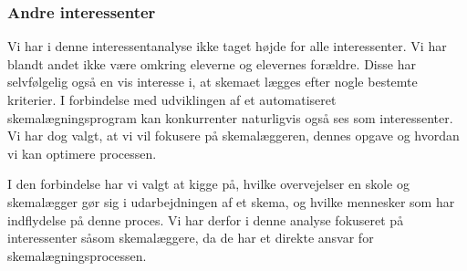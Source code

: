 \subsubsection{Andre interessenter}
Vi har i denne interessentanalyse ikke taget højde for alle interessenter. Vi har blandt andet ikke være omkring eleverne og elevernes forældre. Disse har selvfølgelig også en vis interesse i, at skemaet lægges efter nogle bestemte kriterier. I forbindelse med udviklingen af et automatiseret skemalægningsprogram kan konkurrenter naturligvis også ses som interessenter. Vi har dog valgt, at vi vil fokusere på skemalæggeren, dennes opgave og hvordan vi kan optimere processen.

I den forbindelse har vi valgt at kigge på, hvilke overvejelser en skole og skemalægger gør sig i udarbejdningen af et skema, og hvilke mennesker som har indflydelse på denne proces. Vi har derfor i denne analyse fokuseret på interessenter såsom skemalæggere, da de har et direkte ansvar for skemalægningsprocessen.





